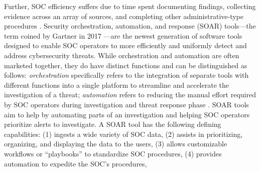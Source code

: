 
Further, SOC efficiency suffers due to time spent documenting findings, collecting evidence across an array of sources, and completing other administrative-type procedures \citep{BREWER20198}. Security orchestration, automation, and response (SOAR) tools---the term coined by Gartner in 2017 \citep{BREWER20198}---are the newest generation of software tools designed to enable SOC operators to more efficiently and uniformly detect and address cybersecurity threats. 
While orchestration and automation are often marketed together, they do have distinct functions and can be distinguished \citep{islam_babar_nepal_2019} as follows: \textit{orchestration} specifically refers to the integration of separate tools with different functions into a single platform to streamline and accelerate the investigation of a threat; \textit{automation} refers to reducing the manual effort required by SOC operators during investigation and threat response phase \citep{Microsoft}. 
SOAR tools aim to help by automating parts of an investigation and helping SOC operators prioritize alerts to investigate. 
A SOAR tool has the following defining capabilities: 
(1) ingests a wide variety of SOC data, 
(2) assists in prioritizing, organizing, and displaying the data to the users, 
(3) allows customizable workflows or ``playbooks'' to standardize SOC procedures, 
(4) provides automation to expedite the SOC's procedures, 
